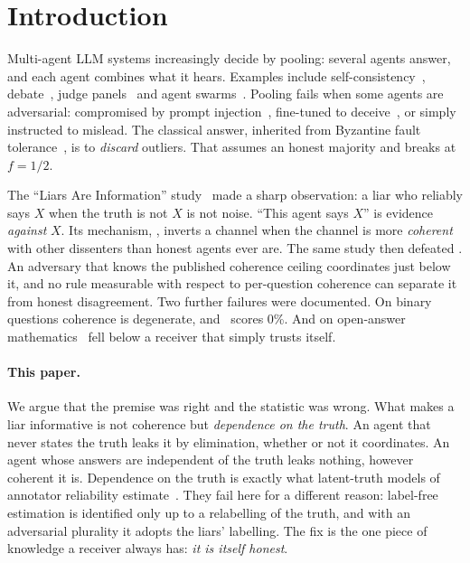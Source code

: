 \section{Introduction}\label{sec:intro}

Multi-agent LLM systems increasingly decide by pooling: several agents answer, and each agent combines what it hears. Examples include self-consistency~\citep{wang2023sc}, debate~\citep{du2024debate}, judge panels~\citep{verga2024juries} and agent swarms~\citep{park2023generative}. Pooling fails when some agents are adversarial: compromised by prompt injection~\citep{greshake2023}, fine-tuned to deceive~\citep{hubinger2024sleeper}, or simply instructed to mislead. The classical answer, inherited from Byzantine fault tolerance~\citep{lamport1982,blanchard2017,yin2018}, is to \emph{discard} outliers. That assumes an honest majority and breaks at $f=1/2$.

The ``Liars Are Information'' study~\citep{das2026aip} made a sharp observation: a liar who reliably says $X$ when the truth is not $X$ is not noise. ``This agent says $X$'' is evidence \emph{against} $X$. Its mechanism, \aip, inverts a channel when the channel is more \emph{coherent} with other dissenters than honest agents ever are. The same study then defeated \aip. An adversary that knows the published coherence ceiling coordinates just below it, and no rule measurable with respect to per-question coherence can separate it from honest disagreement. Two further failures were documented. On binary questions coherence is degenerate, and \aip\ scores 0\%. And on open-answer mathematics \aip\ fell below a receiver that simply trusts itself.

\paragraph{This paper.} We argue that the premise was right and the statistic was wrong. What makes a liar informative is not coherence but \emph{dependence on the truth}. An agent that never states the truth leaks it by elimination, whether or not it coordinates. An agent whose answers are independent of the truth leaks nothing, however coherent it is. Dependence on the truth is exactly what latent-truth models of annotator reliability estimate~\citep{dawid1979,zhang2016}. They fail here for a different reason: label-free estimation is identified only up to a relabelling of the truth, and with an adversarial plurality it adopts the liars' labelling. The fix is the one piece of knowledge a receiver always has: \emph{it is itself honest}.

